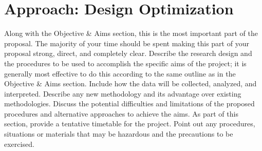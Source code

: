
\section{Approach: Design Optimization} \label{section:approach_design}

Along with the Objective \& Aims section, this is the most important part of the proposal. The majority of
your time should be spent making this part of your proposal strong, direct, and completely clear. Describe
the research design and the procedures to be used to accomplish the specific aims of the project; it is
generally most effective to do this according to the same outline as in the Objective \& Aims section. Include
how the data will be collected, analyzed, and interpreted. Describe any new methodology and its advantage
over existing methodologies. Discuss the potential difficulties and limitations of the proposed procedures
and alternative approaches to achieve the aims. As part of this section, provide a tentative timetable for the
project. Point out any procedures, situations or materials that may be hazardous and the precautions to be
exercised.
